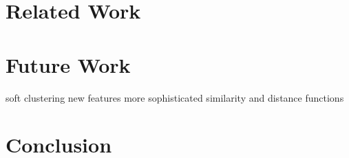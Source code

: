 \documentclass[conference]{IEEEtran}
\begin{document}
\section{Related Work}

\section{Future Work}
soft clustering
new features
more sophisticated similarity and distance functions

\section{Conclusion}
\end{document}
